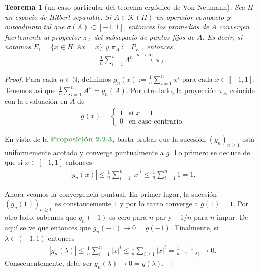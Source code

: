 \documentclass[11pt]{report}
\theoremstyle{colored}
\newtheorem{theorem}{Teorema}[section]
\newcommand{\N}{\mathbb{N}}
\newcommand{\paint}[1]{\color{color}{#1}}
\newcommand{\tpaint}[1]{\paint{\textbf{#1}}}
\begin{document}
\begin{theorem}[un caso particular del teorema ergódico de Von Neumann] Sea $H$ un espacio de Hilbert separable. Si $A \in \mathscr{K}(H)$ un operador compacto y autoadjunto tal que $\sigma(A) \subset [-1,1]$, entonces los promedios de $A$ convergen fuertemente al proyector $\pi_A$ del subsepacio de puntos fijos de $A$. Es decir, si notamos $E_1 = \{x \in H : Ax = x\}$ y $\pi_A := P_{E_1}$, entonces
\begin{align*}
\frac{1}{n}\sum_{i=1}^{n}A^n \ \xrightarrow{n \to \infty} \ \pi_A.
\end{align*}
\end{theorem}
\begin{proof} Para cada $n \in \N$, definimos $g_n(x) := \frac{1}{n}\sum_{i=1}^nx^i$ para cada $x \in [-1,1]$. Tenemos así que $\frac{1}{n}\sum_{i=1}^{n}A^n = g_n(A)$. Por otro lado, la proyección $\pi_A$ coincide con la evaluación en $A$ de 
\begin{align*}
g(x) = \begin{cases}
1 &\text{si $x = 1$}\\
0 &\text{en caso contrario}
\end{cases}
\end{align*}

En vista de la $\tpaint{Proposición 2.2.3}$, basta probar que la sucesión $(g_n)_{n \geq 1}$ está uniformemente acotada y converge puntualmente a $g$. Lo primero se deduce de que si $x \in [-1,1]$ entonces
\begin{align*}
|g_n(x)| \leq \frac{1}{n}\sum_{i=1}^n|x|^i \leq \frac{1}{n}\sum_{i=1}^n1 = 1.
\end{align*}

Ahora veamos la convergencia puntual. En primer lugar, la sucesión $(g_n(1))_{n \geq 1}$ es constantemente $1$ y por lo tanto converge a $g(1) = 1$. Por otro lado, sabemos que $g_n(-1)$ es cero para $n$ par y $-1/n$ para $n$ impar. De aquí se ve que entonces que $g_n(-1) \to 0 = g(-1)$. Finalmente, si $\lambda \in (-1,1)$ entonces
\begin{align*}
|g_n(\lambda)| \leq \frac{1}{n}\sum_{i=1}^n|x|^i \leq \frac{1}{n}\sum_{i \geq 1}|x|^i = \frac{1}{n} \cdot \frac{1}{1-|\lambda|} \to 0.
\end{align*}
Consecuentemente, debe ser $g_n(\lambda) \to 0 = g(\lambda)$.
\end{proof}
\end{document}
